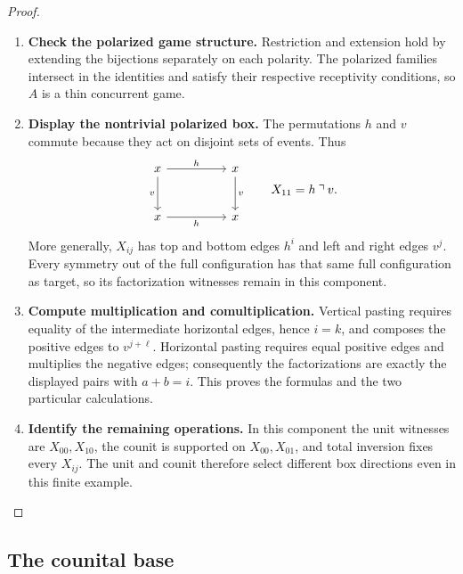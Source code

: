 \documentclass[oneside]{article}
\newcommand{\trcorner}{\mathbin{\urcorner}}
\theoremstyle{plain}
\theoremstyle{definition}
\theoremstyle{remark}
\begin{document}
\begin{proof}
    \leavevmode
    \begin{enumerate}[beginpenalty=10000]
        \item \textbf{Check the polarized game structure.}
        Restriction and extension hold by extending the bijections
        separately on each polarity. The polarized families intersect
        in the identities and satisfy their respective receptivity
        conditions, so \(A\) is a thin concurrent game.

        \item \textbf{Display the nontrivial polarized box.}
        The permutations \(h\) and \(v\) commute because they act on
        disjoint sets of events. Thus
        \[
        \begin{tikzcd}[column sep=huge,row sep=large]
          x\arrow[r,"h"]\arrow[d,"v"']&x\arrow[d,"v"]\\
          x\arrow[r,"h"']&x
        \end{tikzcd}
        \qquad X_{11}=h\trcorner v.
        \]
        More generally, \(X_{ij}\) has top and bottom edges \(h^i\)
        and left and right edges \(v^j\). Every symmetry out of the
        full configuration has that same full configuration as target,
        so its factorization witnesses remain in this component.

        \item \textbf{Compute multiplication and comultiplication.}
        Vertical pasting requires equality of the intermediate
        horizontal edges, hence \(i=k\), and composes the positive
        edges to \(v^{j+\ell}\). Horizontal pasting requires equal
        positive edges and multiplies the negative edges; consequently
        the factorizations are exactly the displayed pairs with
        \(a+b=i\). This proves the formulas and the two particular
        calculations.

        \item \textbf{Identify the remaining operations.}
        In this component the unit witnesses are \(X_{00},X_{10}\),
        the counit is supported on \(X_{00},X_{01}\), and total
        inversion fixes every \(X_{ij}\). The unit and counit therefore
        select different box directions even in this finite example.
        \qedhere
    \end{enumerate}
\end{proof}

\subsection{The counital base}
\end{document}
